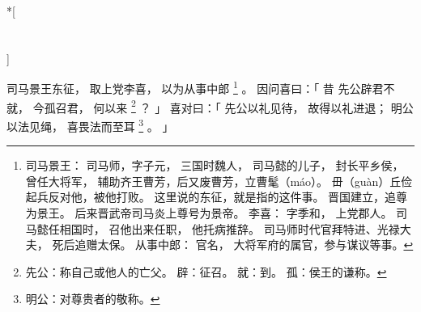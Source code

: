 
\switchcolumn[0]*[\section{}]

司马景王东征，
取上党李喜，
以为从事中郎%
\footnote{%
    司马景王：
        司马师，字子元，
        三国时魏人，
        司马懿的儿子，
        封长平乡侯，曾任大将军，
        辅助齐王曹芳，后又废曹芳，立曹髦（máo）。
        毌（guàn）丘俭起兵反对他，被他打败。
        这里说的东征，就是指的这件事。
        晋国建立，追尊为景王。
        后来晋武帝司马炎上尊号为景帝。
    李喜：
        字季和，
        上党郡人。
        司马懿任相国时，
        召他出来任职，
        他托病推辞。
        司马师时代官拜特进、光禄大夫，
        死后追赠太保。
    从事中郎：
        官名，
        大将军府的属官，参与谋议等事。
}%
。
因问喜曰：「
    昔
    先公辟君不就，
    今孤召君，
    何以来%
    \footnote{%
        先公：称自己或他人的亡父。
        辟：征召。
        就：到。
        孤：侯王的谦称。
    }%
    ？
」
喜对曰：「
    先公以礼见待，
    故得以礼进退；
    明公以法见绳，
    喜畏法而至耳%
    \footnote{%
        明公：对尊贵者的敬称。
    }%
    。
」

\switchcolumn


